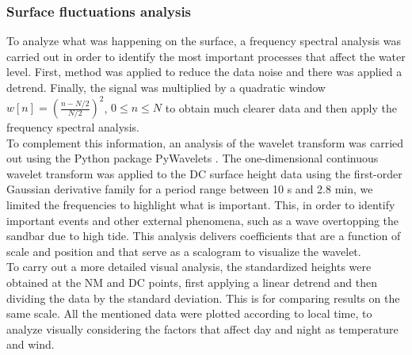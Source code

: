 \documentclass[tesis.tex]{subfiles}
\begin{document}
\subsubsection{Surface fluctuations analysis}

To analyze what was happening on the surface, a frequency spectral analysis was carried out in order to identify the most important processes that affect the water level. First, \cite{welch1967use} method was applied to reduce the data noise and there was applied a detrend. Finally, the signal was multiplied by a quadratic window $w[n]=\left( \frac{n-N/2}{N/2} \right)^2$, $0 \leq n \leq N$ to obtain much clearer data and then apply the frequency spectral analysis. \\

To complement this information, an analysis of the wavelet transform was carried out using the Python package PyWavelets \citep{lee2019pywavelets}. The one-dimensional continuous wavelet transform was applied to the DC surface height data using the first-order Gaussian derivative family for a period range between 10 s and 2.8 min, we limited the frequencies to highlight what is important. This, in order to identify important events and other external phenomena, such as a wave overtopping the sandbar due to high tide. This analysis delivers coefficients that are a function of scale and position and that serve as a scalogram to visualize the wavelet.\\

To carry out a more detailed visual analysis, the standardized heights were obtained at the NM and DC points, first applying a linear detrend and then dividing the data by the standard deviation. This is for comparing results on the same scale. All the mentioned data were plotted according to local time, to analyze visually considering the factors that affect day and night as temperature and wind.
\end{document}
